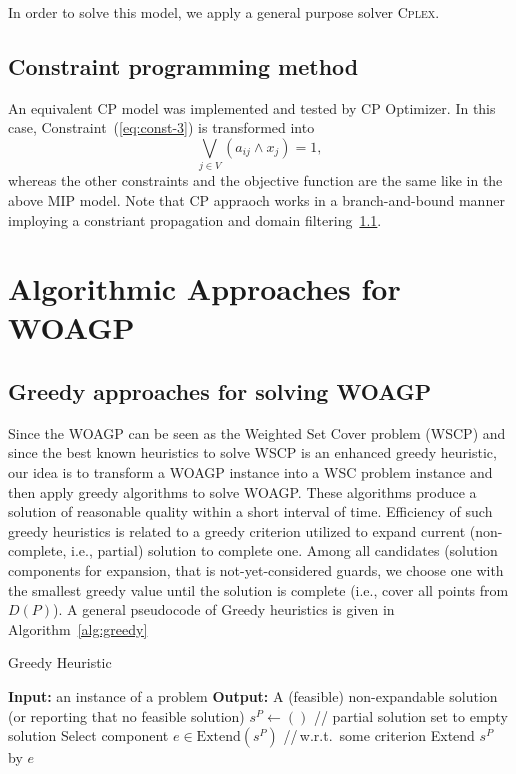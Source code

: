 \documentclass[runningheads,a4paper]{elsarticle}
\begin{document}
      In order to solve this model, we apply a general purpose solver \textsc{Cplex}.
       \subsection{Constraint programming method} An equivalent CP model was implemented and tested by CP Optimizer. In this case,  Constraint~(\ref{eq:const-3}) is transformed into 
       \begin{equation}
           \bigvee_{ j \in V } (a_{ij} \wedge x_j) = 1, 
       \end{equation}
      whereas the other constraints and the objective function are the same like in the above MIP model. Note that CP appraoch works in a branch-and-bound manner imploying a constriant propagation and domain filtering~\ref{}.
     \section{Algorithmic Approaches for WOAGP}
     \subsection{Greedy approaches for solving WOAGP}
      Since the WOAGP can be seen as the Weighted Set Cover problem (WSCP) and since the best known heuristics to solve WSCP is an enhanced greedy heuristic, our idea is to transform a WOAGP instance into a WSC problem instance and then
          apply greedy algorithms to solve WOAGP. These algorithms produce a solution of reasonable quality within a short interval of time. Efficiency of such greedy heuristics is related to a greedy criterion utilized to expand current (non-complete, i.e., partial) solution to complete one. Among all candidates (solution components for expansion, that is not-yet-considered guards, we choose one with the smallest greedy value until the solution is complete (i.e., cover all  points from $D(P)$).
          A general pseudocode of Greedy heuristics is given in Algorithm~\ref{alg:greedy}

          \begin{algorithm}[!t]
          	\caption{Greedy Heuristic}\label{alg:greedy}
          	\begin{algorithmic}[1]
          		\State \textbf{Input:} an instance of a problem
          		\State \textbf{Output:} A (feasible) non-expandable solution (or reporting that no feasible solution)
          		\State $s^{P} \gets ()$ \hspace{0.3cm}// partial solution set to empty solution
          		\State Select component $e \in  \text{Extend}(s^{P})$ \hspace{0.3cm}//\,w.r.t.\  some criterion
          		\State Extend $s^{P}$ by $e$
          		\EndWhile
          	\end{algorithmic}
          \end{algorithm}
\end{document}

